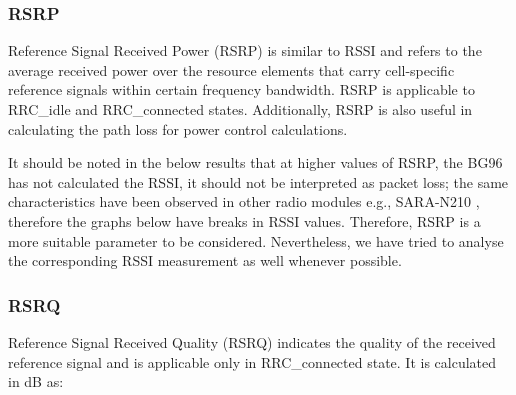 \documentclass[conference,a4paper,xcolor=table]{IEEEtran}
\begin{document}
\subsubsection{RSRP}
Reference Signal Received Power (RSRP) is similar to RSSI and refers to the average received power over the resource elements that carry cell-specific reference signals within certain frequency bandwidth. RSRP is applicable to RRC\_idle and RRC\_connected states. Additionally, RSRP is also useful in calculating the path loss for power control calculations.
\begin{table}[h]
\centering
{}
\caption {RSRP reference values for NB-IoT as per 3GPP standards \cite{3GPP,sikora2019performance}}
\label{nbiotRSRP}
\end{table}
\newline It should be noted in the below results that at higher values of RSRP, the BG96 has not calculated the RSSI, it should not be interpreted as packet loss; the same characteristics have been observed in other radio modules e.g., SARA-N210 \cite{basu2019experimental}, therefore the graphs below have breaks in RSSI values. Therefore, RSRP is a more suitable parameter to be considered. Nevertheless, we have tried to analyse the corresponding RSSI measurement as well whenever possible.
\subsubsection{RSRQ}
Reference Signal Received Quality (RSRQ) indicates the quality of the received reference signal and is applicable only in RRC\_connected state. It is calculated in dB as:  
\end{document}
